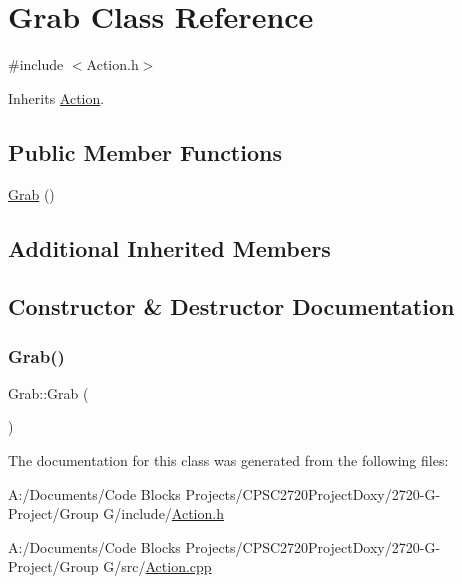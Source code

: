 \hypertarget{class_grab}{}\section{Grab Class Reference}
\label{class_grab}


{\ttfamily \#include $<$Action.\+h$>$}



Inherits \mbox{\hyperlink{class_action}{Action}}.

\subsection*{Public Member Functions}
\begin{DoxyCompactItemize}
\item 
\mbox{\hyperlink{class_grab_addc5dd3793baf19493479e50c619193a}{Grab}} ()
\end{DoxyCompactItemize}
\subsection*{Additional Inherited Members}


\subsection{Constructor \& Destructor Documentation}
\mbox{\label{class_grab_addc5dd3793baf19493479e50c619193a}} 
\subsubsection{\texorpdfstring{Grab()}{Grab()}}
{\footnotesize\ttfamily Grab\+::\+Grab (\begin{DoxyParamCaption}{ }\end{DoxyParamCaption})}



The documentation for this class was generated from the following files\+:\begin{DoxyCompactItemize}
\item 
A\+:/\+Documents/\+Code Blocks Projects/\+C\+P\+S\+C2720\+Project\+Doxy/2720-\/\+G-\/\+Project/\+Group G/include/\mbox{\hyperlink{_action_8h}{Action.\+h}}\item 
A\+:/\+Documents/\+Code Blocks Projects/\+C\+P\+S\+C2720\+Project\+Doxy/2720-\/\+G-\/\+Project/\+Group G/src/\mbox{\hyperlink{_action_8cpp}{Action.\+cpp}}\end{DoxyCompactItemize}
